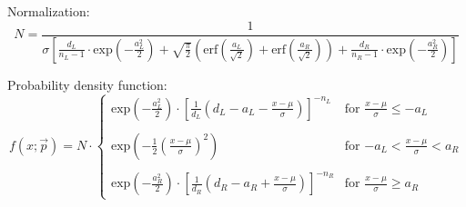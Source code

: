 Normalization:
\begin{equation}
N = \frac{1}{\sigma\left[\frac{d_{L}}{n_{L}-1} \cdot \text{exp}\left(-\frac{a_{L}^{2}}{2}\right) + \sqrt{\frac{\pi}{2}}\left(\text{erf}\left(\frac{a_{L}}{\sqrt{2}}\right)+\text{erf}\left(\frac{a_{R}}{\sqrt{2}}\right)\right) + \frac{d_{R}}{n_{R}-1} \cdot \text{exp}\left(-\frac{a_{R}^{2}}{2}\right)  \right]}
\end{equation}

Probability density function:
\begin{equation}
f(x;\vec{p}) = N \cdot \begin{cases}
\text{exp}\left(-\frac{a_{L}^{2}}{2}\right) \cdot \left[\frac{1}{d_{L}}\left(d_{L} - a_{L} - \frac{x-\mu}{\sigma}\right)\right]^{-n_{L}} & \text{for $\frac{x-\mu}{\sigma} \leq -a_{L}$} \\
\\
\text{exp}\left(-\frac{1}{2}\left(\frac{x-\mu}{\sigma}\right)^2\right) & \text{for $-a_{L} < \frac{x-\mu}{\sigma} < a_{R}$} \\
\\
\text{exp}\left(-\frac{a_{R}^{2}}{2}\right) \cdot \left[\frac{1}{d_{R}}\left(d_{R} - a_{R} + \frac{x-\mu}{\sigma}\right)\right]^{-n_{R}} & \text{for $\frac{x-\mu}{\sigma} \geq a_{R}$}
\end{cases}
\end{equation}
\newpage

